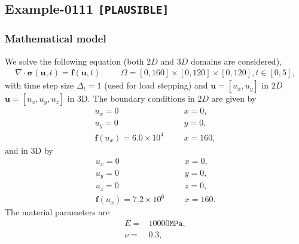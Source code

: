 %
\clearpage
%
\subsection{Example-0111 \texttt{[PLAUSIBLE]}}
%
%
\subsubsection{Mathematical model}
%
We solve the following equation (both $2D$ and $3D$ domains are considered),
%
\begin{align}
    \nabla \cdot \boldsymbol{\sigma} (\boldsymbol{u}, t) = \boldsymbol{f} (\boldsymbol{u}, t) & &&\Omega = [0, 160] \times [0, 120] \times [0, 120], t \in [0, 5],
\end{align}
%
with time step size $\Delta_t = 1$ (used for load stepping)
and $\boldsymbol{u} = [u_x,u_y]$ in $2D$ $\boldsymbol{u} = [u_x,u_y,u_z]$ in 3D.
The boundary conditions in $2D$ are given by
%
\begin{align}
    u_x = 0 & &&x = 0, \\
    u_y = 0 & &&y = 0, \\
		\boldsymbol{f} (u_x) = 6.0 \times 10^{4} & &&x = 160,
\end{align}
%
and in 3D by
%
\begin{align}
    u_x = 0 & &&x = 0, \\
    u_y = 0 & &&y = 0, \\
    u_z = 0 & &&z = 0, \\
		\boldsymbol{f} (u_x) = 7.2 \times 10^{6} & &&x = 160.
\end{align}
%
The material parameters are
%
\begin{align}
    E = & 10000\texttt{MPa}, \\
    \nu = & 0.3, \\
\end{align}
%
%
